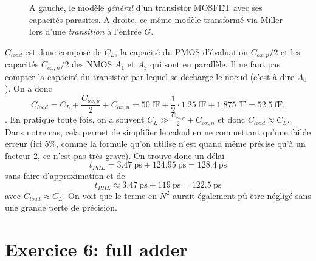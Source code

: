 \documentclass[frenchb,DIV=14]{scrartcl}
\begin{document}
\begin{figure}
	\centering
	\caption{A gauche, le modèle \emph{général} d'un transistor
	MOSFET avec ses capacités parasites. A droite, ce même modèle
	transformé via Miller lors d'une \emph{transition} à l'entrée $G$.}
	\label{fig:mos-model}
\end{figure}

$C_{load}$ est donc composé de $C_L$, la capacité
du PMOS d'évaluation $C_{ox,p}/2$ et les capacités $C_{ox,n}/2$ des NMOS
$A_1$ et $A_3$ qui sont en parallèle. Il ne faut pas compter la capacité
du transistor par lequel se décharge le noeud (c'est à dire $A_0$).
On a donc
\[ C_{load} = C_L + \frac{C_{ox,p}}{2} + C_{ox,n} = \SI{50}{\femto\farad}
+ \frac{1}{2}\cdot\SI{1.25}{\femto\farad} + \SI{1.875}{\femto\farad} = \SI{52.5}{\femto\farad}. \].
En pratique toute fois, on a souvent $C_L \gg \frac{C_{ox,p}}{2} + C_{ox,n}$
et donc $C_{load} \approx C_L$.  Dans notre cas, cela permet de simplifier
le calcul en ne commettant qu'une faible erreur (ici 5\%, comme
la formule qu'on utilise n'est quand même précise qu'à un facteur 2, ce n'est
pas très grave). On trouve donc un délai
\[ t_{PHL} = \SI{3.47}{\pico\second} + \SI{124.95}{\pico\second} =
\SI{128.4}{\pico\second} \]
sans faire d'approximation et de
\[ t_{PHL} \approx \SI{3.47}{\pico\second} + \SI{119}{\pico\second}
= \SI{122.5}{\pico\second} \]
avec $C_{load} \approx C_L$.
On voit que le terme en $N^2$ aurait également pû être négligé sans une grande
perte de précision.

\clearpage
\section*{Exercice 6: full adder}
\end{document}
